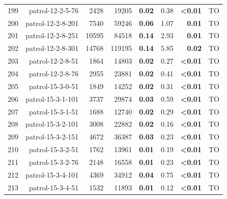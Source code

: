\begin{longtable}{lrr@{\hskip 12pt}r@{\hskip 12pt}r@{\hskip 12pt}r@{\hskip 12pt}r@{\hskip 12pt}r}
199 & \multirow{1}{*}{patrol-12-2-5-76} & \multirow{1}{*}{2428} & \multirow{1}{*}{19205} & \textbf{0.02} & 0.38 & \textbf{<0.01} & TO \\
200 & \multirow{1}{*}{patrol-12-2-8-201} & \multirow{1}{*}{7540} & \multirow{1}{*}{59246} & \textbf{0.06} & 1.07 & \textbf{0.01} & TO \\
201 & \multirow{1}{*}{patrol-12-2-8-251} & \multirow{1}{*}{10595} & \multirow{1}{*}{84518} & \textbf{0.14} & 2.93 & \textbf{0.01} & TO \\
202 & \multirow{1}{*}{patrol-12-2-8-301} & \multirow{1}{*}{14768} & \multirow{1}{*}{119195} & \textbf{0.14} & 5.85 & \textbf{0.02} & TO \\
203 & \multirow{1}{*}{patrol-12-2-8-51} & \multirow{1}{*}{1864} & \multirow{1}{*}{14803} & \textbf{0.02} & 0.27 & \textbf{<0.01} & TO \\
204 & \multirow{1}{*}{patrol-12-2-8-76} & \multirow{1}{*}{2955} & \multirow{1}{*}{23881} & \textbf{0.02} & 0.41 & \textbf{<0.01} & TO \\
205 & \multirow{1}{*}{patrol-15-3-0-51} & \multirow{1}{*}{1849} & \multirow{1}{*}{14252} & \textbf{0.02} & 0.31 & \textbf{<0.01} & TO \\
206 & \multirow{1}{*}{patrol-15-3-1-101} & \multirow{1}{*}{3737} & \multirow{1}{*}{29874} & \textbf{0.03} & 0.59 & \textbf{<0.01} & TO \\
207 & \multirow{1}{*}{patrol-15-3-1-51} & \multirow{1}{*}{1688} & \multirow{1}{*}{12740} & \textbf{0.02} & 0.29 & \textbf{<0.01} & TO \\
208 & \multirow{1}{*}{patrol-15-3-2-101} & \multirow{1}{*}{3008} & \multirow{1}{*}{22882} & \textbf{0.02} & 0.16 & \textbf{<0.01} & TO \\
209 & \multirow{1}{*}{patrol-15-3-2-151} & \multirow{1}{*}{4672} & \multirow{1}{*}{36387} & \textbf{0.03} & 0.23 & \textbf{<0.01} & TO \\
210 & \multirow{1}{*}{patrol-15-3-2-51} & \multirow{1}{*}{1762} & \multirow{1}{*}{13961} & \textbf{0.01} & 0.19 & \textbf{<0.01} & TO \\
211 & \multirow{1}{*}{patrol-15-3-2-76} & \multirow{1}{*}{2148} & \multirow{1}{*}{16558} & \textbf{0.01} & 0.23 & \textbf{<0.01} & TO \\
212 & \multirow{1}{*}{patrol-15-3-4-101} & \multirow{1}{*}{4369} & \multirow{1}{*}{34912} & \textbf{0.04} & 0.75 & \textbf{<0.01} & TO \\
213 & \multirow{1}{*}{patrol-15-3-4-51} & \multirow{1}{*}{1532} & \multirow{1}{*}{11893} & \textbf{0.01} & 0.12 & \textbf{<0.01} & TO \\

\end{longtable}
